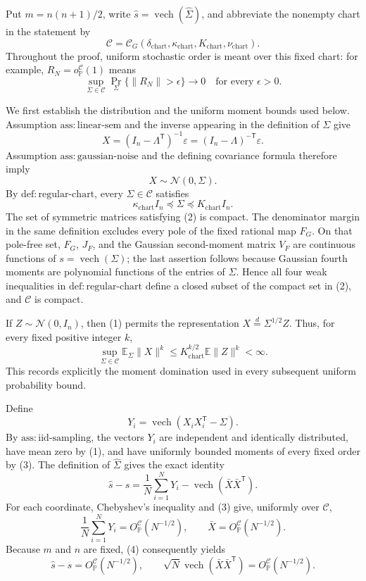 Put \(m=n(n+1)/2\), write \(\widehat s=\operatorname{vech}(\widehat\Sigma)\), and abbreviate the nonempty chart in the statement by
\[
 \mathcal C=\mathcal C_G(\delta_{\mathrm{chart}},\kappa_{\mathrm{chart}},K_{\mathrm{chart}},\nu_{\mathrm{chart}}).
\]
Throughout the proof, uniform stochastic order is meant over this fixed chart: for example, \(R_N=o_{\mathbb P}^{\mathcal C}(1)\) means
\[
 \sup_{\Sigma\in\mathcal C}\Pr_{\Sigma}\{\lVert R_N\rVert>\epsilon\}\longrightarrow0
 \quad\text{for every }\epsilon>0.
\]

We first establish the distribution and the uniform moment bounds used below.  Assumption \(\mathrm{ass:linear\mbox{-}sem}\) and the inverse appearing in the definition of \(\Sigma\) give
\[
 X=(I_n-\Lambda^{\mathsf T})^{-1}\varepsilon
   =(I_n-\Lambda)^{-\mathsf T}\varepsilon.
\]
Assumption \(\mathrm{ass:gaussian\mbox{-}noise}\) and the defining covariance formula therefore imply
\[
 X\sim\mathcal N(0,\Sigma).
\tag{1}
\]
By \(\mathrm{def:regular\mbox{-}chart}\), every \(\Sigma\in\mathcal C\) satisfies
\[
 \kappa_{\mathrm{chart}}I_n\preceq\Sigma\preceq K_{\mathrm{chart}}I_n.
\tag{2}
\]
The set of symmetric matrices satisfying (2) is compact.  The denominator margin in the same definition excludes every pole of the fixed rational map \(F_G\).  On that pole-free set, \(F_G\), \(J_F\), and the Gaussian second-moment matrix \(V_F\) are continuous functions of \(s=\operatorname{vech}(\Sigma)\); the last assertion follows because Gaussian fourth moments are polynomial functions of the entries of \(\Sigma\).  Hence all four weak inequalities in \(\mathrm{def:regular\mbox{-}chart}\) define a closed subset of the compact set in (2), and \(\mathcal C\) is compact.

If \(Z\sim\mathcal N(0,I_n)\), then (1) permits the representation \(X\overset{d}=\Sigma^{1/2}Z\).  Thus, for every fixed positive integer \(k\),
\[
 \sup_{\Sigma\in\mathcal C}\mathbb E_{\Sigma}\lVert X\rVert^k
 \le K_{\mathrm{chart}}^{k/2}\mathbb E\lVert Z\rVert^k<\infty.
\tag{3}
\]
This records explicitly the moment domination used in every subsequent uniform probability bound.

Define
\[
 Y_i=\operatorname{vech}(X_iX_i^{\mathsf T}-\Sigma).
\]
By \(\mathrm{ass:iid\mbox{-}sampling}\), the vectors \(Y_i\) are independent and identically distributed, have mean zero by (1), and have uniformly bounded moments of every fixed order by (3).  The definition of \(\widehat\Sigma\) gives the exact identity
\[
 \widehat s-s
 =\frac1N\sum_{i=1}^N Y_i
  -\operatorname{vech}(\bar X\bar X^{\mathsf T}).
\tag{4}
\]
For each coordinate, Chebyshev's inequality and (3) give, uniformly over \(\mathcal C\),
\[
 \frac1N\sum_{i=1}^N Y_i=O_{\mathbb P}^{\mathcal C}(N^{-1/2}),
 \qquad
 \bar X=O_{\mathbb P}^{\mathcal C}(N^{-1/2}).
\]
Because \(m\) and \(n\) are fixed, (4) consequently yields
\[
 \widehat s-s=O_{\mathbb P}^{\mathcal C}(N^{-1/2}),
 \qquad
 \sqrt N\operatorname{vech}(\bar X\bar X^{\mathsf T})
 =O_{\mathbb P}^{\mathcal C}(N^{-1/2}).
\tag{5}
\]

